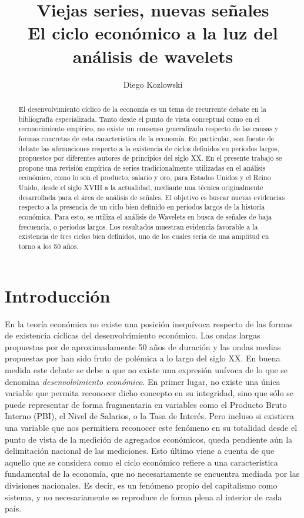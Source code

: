 \documentclass[a4paper]{article}
\title{Viejas series, nuevas señales\\ {\large El ciclo económico a la luz del análisis de wavelets} }
\author[1]{Diego Kozlowski}
\affil[1]{Maestr\'ia en Data Mining \& Knowledge Discovery, FCEN-UBA \\ diegokoz92@gmail.com}
\date{}                     %
\begin{document}
\maketitle

\begin{abstract}
	
	El desenvolvimiento cíclico de la economía es un tema de recurrente debate en la bibliografía especializada. Tanto desde el punto de vista conceptual como en el reconocimiento empírico, no existe un consenso generalizado respecto de las causas y formas concretas de esta característica de la economía. En particular, son fuente de debate las afirmaciones respecto a la existencia de ciclos definidos en períodos largos, propuestos por diferentes autores de principios del siglo XX. En el presente trabajo se propone una revisión empírica de series tradicionalmente utilizadas en el análisis económico, como lo son el producto, salario y oro, para Estados Unidos y el Reino Unido, desde el siglo XVIII a la actualidad, mediante una técnica originalmente desarrollada para el área de análisis de señales. El objetivo es buscar nuevas evidencias respecto a la presencia de un ciclo bien definido en períodos largos de la historia económica. Para esto, se utiliza el análisis de Wavelets en busca de señales de baja frecuencia, o períodos largos. Los resultados muestran evidencia favorable a la existencia de tres ciclos bien definidos, uno de los cuales sería de una amplitud en torno a los 50 años.
	
\end{abstract}

\section{Introducción}

En la teoría económica no existe una posición inequívoca respecto de las formas de existencia cíclicas del desenvolvimiento económico. Las ondas largas propuestas por \cite{kondratieff1979long} de aproximadamente 50 años de duración y las ondas medias propuestas por \cite{kuznets1930secular} han sido fruto de polémica a lo largo del siglo XX. En buena medida este debate se debe a que no existe una expresión unívoca de lo que se denomina \textit{desenvolvimiento económico}. En primer lugar, no existe una única variable que permita reconocer dicho concepto en su integridad, sino que sólo se puede representar de forma fragmentaria en variables como el Producto Bruto Interno (PBI), el Nivel de Salarios, o la Tasa de Interés. Pero incluso si existiera una variable que nos permitiera reconocer este fenómeno en su totalidad desde el punto de vista de la medición de agregados económicos, queda pendiente aún la delimitación nacional de las mediciones. Esto último viene a cuenta de que aquello que se considera como el ciclo económico refiere a una característica fundamental de la economía, que no necesariamente se encuentra mediada por las divisiones nacionales. Es decir, es un fenómeno propio del capitalismo como sistema, y no necesariamente se reproduce de forma plena al interior de cada país. 
\end{document}
